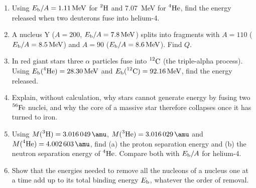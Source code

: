 \begin{enumerate}[itemsep=3pt]
minimum gamma-ray energy that can split it into a proton and a neutron? (Neglect the recoil.)
\item\label{pp:nuc-dd} Using $\Eb/A=\SI{1.11}{\MeV}$ for $\prescript{2}{}{\mathrm{H}}$ and \SI{7.07}{\MeV} for $\prescript{4}{}{\mathrm{He}}$,
find the energy released when two deuterons fuse into helium-4.
\item\label{pp:nuc-y} A nucleus Y ($A=200$, $\Eb/A=\SI{7.8}{\MeV}$) splits into fragments with $A=110$
($\Eb/A=\SI{8.5}{\MeV}$) and $A=90$ ($\Eb/A=\SI{8.6}{\MeV}$). Find $Q$.
\item\label{pp:nuc-3alpha} In red giant stars three $\alpha$ particles fuse into $\prescript{12}{}{\mathrm{C}}$ (the
triple-alpha process). Using $\Eb(\iso{4}{He})=\SI{28.30}{\MeV}$ and $\Eb(\iso{12}{C})=\SI{92.16}{\MeV}$,
find the energy released.
\item\label{pp:nuc-fefe} Explain, without calculation, why stars cannot generate energy by fusing two
$\prescript{56}{}{\mathrm{Fe}}$ nuclei, and why the core of a massive star therefore collapses once it has turned to iron.
\item\label{pp:nuc-sphe} Using $M(\iso{3}{H})=\SI{3.016049}{\amu}$, $M(\iso{3}{He})=\SI{3.016029}{\amu}$ and
$M(\iso{4}{He})=\SI{4.002603}{\amu}$, find (a) the proton separation energy and (b) the neutron separation
energy of $\prescript{4}{}{\mathrm{He}}$. Compare both with $E_{\mathrm{b}}/A$ for helium-4.
\item\label{pp:nuc-snsum} Show that the energies needed to remove all the nucleons of a nucleus one at a
time add up to its total binding energy $E_{\mathrm{b}}$, whatever the order of removal.
\end{enumerate}


